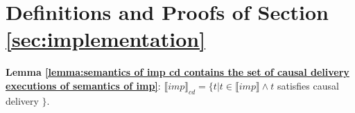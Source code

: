 














\section{Definitions and Proofs of Section \ref{sec:implementation}}
\label{sec:appendix definitions and proofs of section implementation}



{\noindent \bf Lemma \ref{lemma:semantics of imp cd contains the set of causal delivery executions of semantics of imp}}: $\llbracket imp \rrbracket_{cd} = \{ t \vert t \in \llbracket imp \rrbracket \wedge t$ satisfies causal delivery $\}$.

